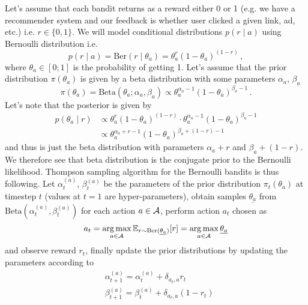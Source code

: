 \documentclass{myclass}
\begin{document}
Let's assume that each bandit returns as a reward either 0 or 1 (e.g. we have a recommender system
and our feedback is whether user clicked a given link, ad, etc.) i.e. $r \in \{0,1\}$. We will model
conditional distributions $p(r \mid a)$ using Bernoulli distribution i.e.
\[
    p(r \mid a) = \text{Ber}(r \mid \theta_a) = \theta_a^r (1 - \theta_a)^{(1-r)}\,,
\]
where $\theta_a \in [0;1]$ is the probability of getting 1. Let's assume that the prior distribution
$\pi(\theta_a)$ is given by a beta distribution with some parameters $\alpha_a$, $\beta_a$
\[
    \pi(\theta_a) = \text{Beta}(\theta_a; \alpha_a, \beta_a) \propto \theta_a^{\alpha_a - 1} (1 - \theta_a)^{\beta_a - 1}\,.
\]
Let's note that the posterior is given by
\[
\begin{split}
    p(\theta_a \mid r) &\propto \theta_a^r (1 - \theta_a)^{(1-r)} \cdot \theta_a^{\alpha_a - 1} (1 - \theta_a)^{\beta_a - 1} \\
                       &\propto \theta_a^{\alpha_a + r - 1} (1 - \theta_a)^{\beta_a + (1 - r) -1}
\end{split}
\]
and thus is just the beta distribution with parameters $\alpha_a + r$ and $\beta_a + (1-r)$. We
therefore see that beta distribution is the conjugate prior to the Bernoulli likelihood. Thompson
sampling algorithm for the Bernoulli bandits is thus following. Let $\alpha_t^{(a)}$,
$\beta_t^{(a)}$ be the parameters of the prior distribution $\pi_t(\theta_a)$ at timestep $t$
(values at $t=1$ are hyper-parameters), obtain samples $\underline{\theta_a}$ from
$\text{Beta}(\alpha_t^{(a)}, \beta_t^{(a)})$ for each action $a \in \mathcal{A}$, perform action $a_t$
chosen as
\[
    a_t = \operatorname*{arg\,max}_{a \in \mathcal{A}} \mathbb{E}_{r \sim \text{Ber}(\underline{\theta_a})}[r] = \operatorname*{arg\,max}_{a \in \mathcal{A}} \underline{\theta_a}
\]
and observe reward $r_t$, finally update the prior distributions by updating the parameters
according to
\[
\begin{split}
    &\alpha_{t+1}^{(a)} = \alpha_{t}^{(a)} + \delta_{a_t,a} r_t\\
    &\beta_{t+1}^{(a)} = \beta_{t}^{(a)} + \delta_{a_t,a} (1 - r_t)
\end{split}
\]
\end{document}
